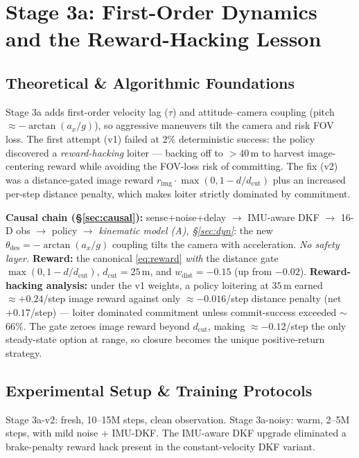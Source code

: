 \documentclass[11pt]{article}
\newcommand{\stagebox}[1]{\vspace{2pt}\noindent\colorbox{boxgray}{%
\parbox{\dimexpr\linewidth-2\fboxsep}{\small #1}}\vspace{4pt}}
\begin{document}
\section{Stage 3a: First-Order Dynamics and the Reward-Hacking Lesson}
\label{sec:3a}
\subsection{Theoretical \& Algorithmic Foundations}
Stage 3a adds first-order velocity lag ($\tau$) and attitude--camera coupling
(pitch $\approx-\arctan(a_x/g)$), so aggressive maneuvers tilt the camera and
risk FOV loss. The first attempt (v1) failed at 2\% deterministic success:
the policy discovered a \emph{reward-hacking} loiter --- backing off to
$>$40\,m to harvest image-centering reward while avoiding the FOV-loss risk of
committing. The fix (v2) was a distance-gated image reward
$r_\text{img}\!\cdot\!\max(0,1-d/d_\text{cut})$ plus an increased per-step
distance penalty, which makes loiter strictly dominated by commitment.

\stagebox{\textbf{Causal chain (\S\ref{sec:causal}):} sense+noise+delay
$\rightarrow$ IMU-aware DKF $\rightarrow$ 16-D obs $\rightarrow$ policy
$\rightarrow$ \emph{kinematic model (A), \S\ref{sec:dyn}}: the new
$\theta_\text{des}=-\arctan(a_x/g)$ coupling tilts the camera with
acceleration. \emph{No safety layer.} \textbf{Reward:} the canonical
\eqref{eq:reward} \emph{with} the distance gate
$\max(0,1-d/d_\text{cut})$, $d_\text{cut}=25\,$m, and $w_\text{dist}=-0.15$
(up from $-0.02$). \textbf{Reward-hacking analysis:} under the v1 weights, a
policy loitering at $35\,$m earned $\approx+0.24$/step image reward against
only $\approx-0.016$/step distance penalty (net $+0.17$/step) --- loiter
dominated commitment unless commit-success exceeded $\sim$66\%. The gate
zeroes image reward beyond $d_\text{cut}$, making $\approx-0.12$/step the only
steady-state option at range, so closure becomes the unique positive-return
strategy.}

\subsection{Experimental Setup \& Training Protocols}
Stage 3a-v2: fresh, 10--15M steps, clean observation. Stage 3a-noisy: warm,
2--5M steps, with mild noise + IMU-DKF. The IMU-aware DKF upgrade eliminated a
brake-penalty reward hack present in the constant-velocity DKF variant.
\end{document}
